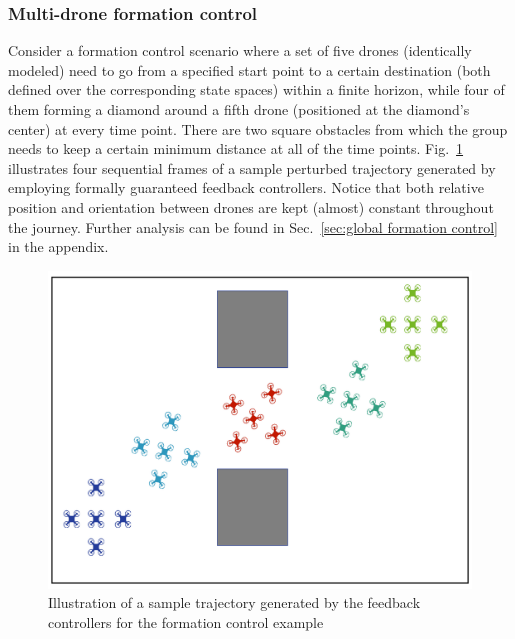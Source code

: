 
\new{
}
\subsubsection{Multi-drone formation control}
\label{subsec:formation_control}
Consider a formation control scenario where a set of five drones (identically modeled) need to go from a specified start point to a certain destination (both defined over the corresponding state spaces) within a finite horizon, while four of them forming a diamond around a fifth drone (positioned at the diamond's center) at every time point. There are two square obstacles from which the group needs to keep a certain minimum distance at all of the time points. Fig.~\ref{fig:formation_ex} illustrates four sequential frames of a sample perturbed trajectory generated by employing formally guaranteed feedback controllers. Notice that both 
relative position and orientation between drones are kept (almost) constant 
throughout the journey. Further analysis can be found in Sec.~\ref{sec:global formation control} in the appendix.
%
 \begin{figure}[t]
	\centering
	\includegraphics[scale=0.22]{figures/formation.pdf}
	\caption{Illustration of a sample trajectory generated by the feedback controllers for the formation control example}
	\label{fig:formation_ex}
	\vspace{-.4cm}
\end{figure} 

